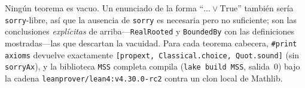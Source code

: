 \documentclass[11pt]{article}
\newcommand{\lean}[1]{{\def\_{\textunderscore\allowbreak}\texttt{#1}}}
\begin{document}
\noindent Ning\'un teorema es vacuo. Un enunciado de la forma
``$\dots\lor\mathrm{True}$'' tambi\'en ser\'ia \lean{sorry}-libre, as\'i que la
ausencia de \lean{sorry} es necesaria pero no suficiente; son las conclusiones
\emph{expl\'icitas} de arriba---\lean{RealRooted} y \lean{BoundedBy} con las
definiciones mostradas---las que descartan la vacuidad. Para cada teorema cabecera,
\lean{\#print axioms} devuelve exactamente
\lean{[propext, Classical.choice, Quot.sound]} (sin \lean{sorryAx}), y la biblioteca
\lean{MSS} completa compila (\lean{lake build MSS}, salida~0) bajo la cadena
\lean{leanprover/lean4:v4.30.0-rc2} contra un clon local de Mathlib.



\end{document}
